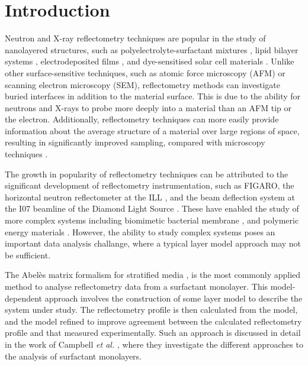 \documentclass[amsmath,amssymb,twocolumn,superscriptaddress]{revtex4-1}
\begin{document}
\maketitle                        %

\section{Introduction}

Neutron and X-ray reflectometry techniques are popular in the study of nanolayered structures, such as polyelectrolyte-surfactant mixtures \cite{Llamas2018}, lipid bilayer systems \cite{Waldie2018}, electrodeposited films \cite{Beebee2019}, and dye-sensitised solar cell materials \cite{McCreeGrey2015}.
Unlike other surface-sensitive techniques, such as atomic force microscopy (AFM) or scanning electron microscopy (SEM), reflectometry methods can investigate buried interfaces in addition to the material surface.
This is due to the ability for neutrons and X-rays to probe more deeply into a material than an AFM tip or the electron.
Additionally, reflectometry techniques can more easily provide information about the average structure of a material over large regions of space, resulting in significantly improved sampling, compared with microscopy techniques \cite{Renaud2009}.

The growth in popularity of reflectometry techniques can be attributed to the significant development of reflectometry instrumentation, such as FIGARO, the horizontal neutron reflectometer at the ILL \cite{Campbell2011}, and the beam deflection system at the I07 beamline of the Diamond Light Source \cite{Arnold2012}.
These have enabled the study of more complex systems including biomimetic bacterial membrane \cite{Barker2016}, and polymeric energy materials \cite{Khodakarimi2016}.
However, the ability to study complex systems poses an important data analysis challange, where a typical layer model approach may not be sufficient.

The Abel\`{e}s matrix formalism for stratified media \cite{Abeles1950}, is the most commonly applied method to analyse reflectometry data from a surfactant monolayer.
This model-dependent approach involves the construction of some layer model to describe the system under study.
The reflectometry profile is then calculated from the model, and the model refined to improve agreement between the calculated reflectometry profile and that measured experimentally.
Such an approach is discussed in detail in the work of Campbell \emph{et al.} \cite{Campbell2018}, where they investigate the different approaches to the analysis of surfactant monolayers.
\end{document}
